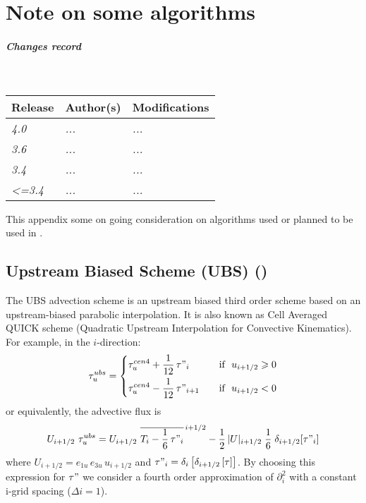 \documentclass[../main/NEMO_manual]{subfiles}
\begin{document}
\chapter{Note on some algorithms}
\label{apdx:ALGOS}

\chaptertoc

\paragraph{Changes record} ~\\

{\footnotesize
  \begin{tabularx}{\textwidth}{l||X|X}
    Release & Author(s) & Modifications \\
    \hline
    {\em   4.0} & {\em ...} & {\em ...} \\
    {\em   3.6} & {\em ...} & {\em ...} \\
    {\em   3.4} & {\em ...} & {\em ...} \\
    {\em <=3.4} & {\em ...} & {\em ...}
  \end{tabularx}
}

\clearpage

This appendix some on going consideration on algorithms used or planned to be used in \NEMO.

\section{Upstream Biased Scheme (UBS) (\protect{})}
\label{sec:ALGOS_tra_adv_ubs}

The UBS advection scheme is an upstream biased third order scheme based on
an upstream-biased parabolic interpolation.
It is also known as Cell Averaged QUICK scheme (Quadratic Upstream Interpolation for Convective Kinematics).
For example, in the $i$-direction:
\begin{equation}
  \label{eq:ALGOS_tra_adv_ubs2}
  \tau_u^{ubs} = \left\{
	 \begin{aligned}
      & \tau_u^{cen4} + \frac{1}{12} \,\tau"_i	   & \quad \text{if }\ u_{i+1/2} \geqslant 0 \\
      & \tau_u^{cen4} - \frac{1}{12} \,\tau"_{i+1} & \quad \text{if }\ u_{i+1/2}       <       0
    \end{aligned}
  \right.
\end{equation}
or equivalently, the advective flux is
\begin{equation}
  \label{eq:ALGOS_tra_adv_ubs2}
  U_{i+1/2} \ \tau_u^{ubs}
  =U_{i+1/2} \ \overline{ T_i - \frac{1}{6}\,\tau"_i }^{\,i+1/2}
  - \frac{1}{2}\, |U|_{i+1/2} \;\frac{1}{6} \;\delta_{i+1/2}[\tau"_i]
\end{equation}
where $U_{i+1/2} = e_{1u}\,e_{3u}\,u_{i+1/2}$ and
$\tau "_i =\delta_i \left[ {\delta_{i+1/2} \left[ \tau \right]} \right]$.
By choosing this expression for $\tau "$ we consider a fourth order approximation of $\partial_i^2$ with
a constant i-grid spacing ($\Delta i=1$).
\end{document}
